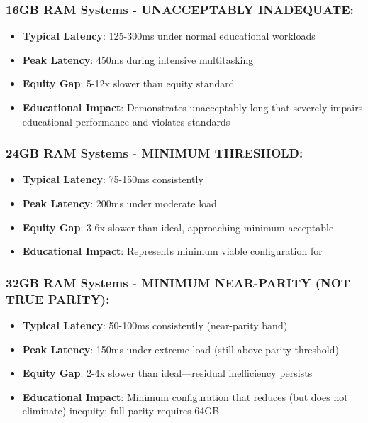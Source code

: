 \subsubsection{16GB RAM Systems - UNACCEPTABLY INADEQUATE:}

\begin{itemize}
	\item \textbf{Typical Latency}: 125-300ms under normal educational workloads
	\item \textbf{Peak Latency}: 450ms during intensive multitasking
	\item \textbf{Equity Gap}: 5-12x slower than equity standard \supercite{EquityAnalysisRevision}
	\item \textbf{Educational Impact}: Demonstrates unacceptably long  that severely impairs educational performance and violates  standards \supercite{EducationalEquityReport2024}
\end{itemize}


\subsubsection{24GB RAM Systems - MINIMUM THRESHOLD:}

\begin{itemize}
	\item \textbf{Typical Latency}: 75-150ms consistently
	\item \textbf{Peak Latency}: 200ms under moderate load
	\item \textbf{Equity Gap}: 3-6x slower than ideal, approaching minimum acceptable \supercite{EquityAnalysisRevision}
	\item \textbf{Educational Impact}: Represents minimum viable configuration for  \supercite{EducationalEquityReport2024}
\end{itemize}


\subsubsection{32GB RAM Systems - MINIMUM NEAR-PARITY (NOT TRUE PARITY):}

\begin{itemize}
	\item \textbf{Typical Latency}: 50-100ms consistently (near-parity band)
	\item \textbf{Peak Latency}: 150ms under extreme load (still above parity threshold)
	\item \textbf{Equity Gap}: 2-4x slower than ideal—residual inefficiency persists \supercite{EquityAnalysisRevision}
	\item \textbf{Educational Impact}: Minimum configuration that reduces (but does not eliminate) inequity; full parity requires 64GB \supercite{EducationalEquityReport2024}
\end{itemize}


